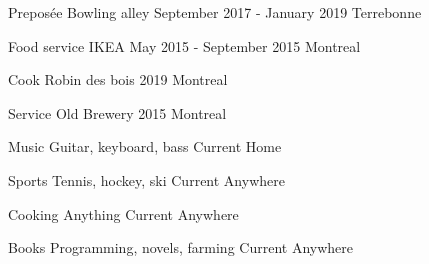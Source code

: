 



\begin{cvhonors}

  \cvhonor
    {Preposée} %
    {Bowling alley} %
    {September 2017 - January 2019} %
    {Terrebonne} %

  \cvhonor
    {Food service} %
    {IKEA} %
    {May 2015 - September 2015} %
    {Montreal} %

\end{cvhonors}



\begin{cvhonors}
  \cvhonor
    {Cook} %
    {Robin des bois} %
    {2019} %
    {Montreal} %

  \cvhonor
    {Service} %
    {Old Brewery} %
    {2015} %
    {Montreal} %

\end{cvhonors}



\begin{cvhonors}
  \cvhonor
    {Music} %
    {Guitar, keyboard, bass} %
    {Current} %
    {Home} %

  \cvhonor
    {Sports} %
    {Tennis, hockey, ski} %
    {Current} %
    {Anywhere} %

  \cvhonor
    {Cooking} %
    {Anything} %
    {Current} %
    {Anywhere} %

  \cvhonor
    {Books} %
    {Programming, novels, farming} %
    {Current} %
    {Anywhere} %
\end{cvhonors}
